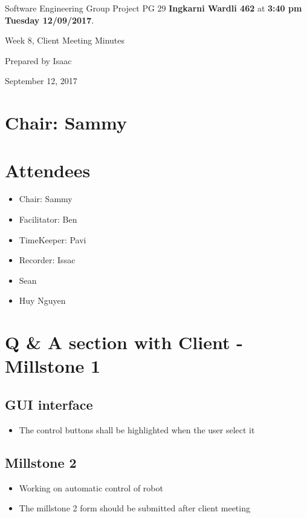 \documentclass[11pt, a4paper]{article}
\begin{document}
\noindent Software Engineering Group Project PG 29 {\bf Ingkarni Wardli 462} at {\bf 3:40 pm Tuesday 12/09/2017}.
\vspace*{10pt}
\begin{center}
\huge Week 8, Client Meeting Minutes
\end{center}
\vspace*{10pt}
\begin{center}
\huge Prepared by Isaac
\end{center}
\begin{center}
\huge September 12, 2017
\end{center}
\section*{Chair: Sammy}

\section{Attendees}
\begin{itemize}
\item Chair: Sammy
\item Facilitator: Ben
\item TimeKeeper: Pavi
\item Recorder: Issac
\item Sean
\item Huy Nguyen
\end{itemize}



\section{Q \& A section with Client - Millstone 1}
\subsection{GUI interface}
\begin{itemize}
\item The control buttons shall be highlighted when the user select it
\end{itemize}

\subsection{Millstone 2}
\begin{itemize}
\item Working on automatic control of robot
\item The millstone 2 form should be submitted after client meeting
\end{itemize}
\end{document}
